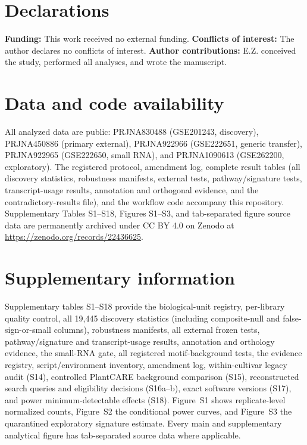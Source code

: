 \documentclass[11pt]{article}
\begin{document}
\section*{Declarations}

\textbf{Funding:} This work received no external funding. \textbf{Conflicts of interest:} The author declares no conflicts of interest. \textbf{Author contributions:} E.Z. conceived the study, performed all analyses, and wrote the manuscript.

\section*{Data and code availability}

All analyzed data are public: PRJNA830488 (GSE201243, discovery), PRJNA450886 (primary external), PRJNA922966 (GSE222651, generic transfer), PRJNA922965 (GSE222650, small RNA), and PRJNA1090613 (GSE262200, exploratory). The registered protocol, amendment log, complete result tables (all discovery statistics, robustness manifests, external tests, pathway/signature tests, transcript-usage results, annotation and orthogonal evidence, and the contradictory-results file), and the workflow code accompany this repository. Supplementary Tables S1--S18, Figures S1--S3, and tab-separated figure source data are permanently archived under CC BY 4.0 on Zenodo at \url{https://zenodo.org/records/22436625}.

\section*{Supplementary information}

Supplementary tables S1--S18 provide the biological-unit registry, per-library quality control, all 19,445 discovery statistics (including composite-null and false-sign-or-small columns), robustness manifests, all external frozen tests, pathway/signature and transcript-usage results, annotation and orthology evidence, the small-RNA gate, all registered motif-background tests, the evidence registry, script/environment inventory, amendment log, within-cultivar legacy audit (S14), controlled PlantCARE background comparison (S15), reconstructed search queries and eligibility decisions (S16a--b), exact software versions (S17), and power minimum-detectable effects (S18). Figure~S1 shows replicate-level normalized counts, Figure~S2 the conditional power curves, and Figure~S3 the quarantined exploratory signature estimate. Every main and supplementary analytical figure has tab-separated source data where applicable.
\end{document}
